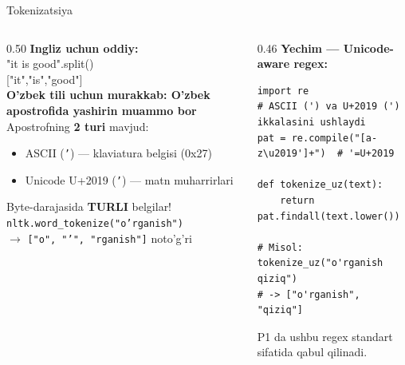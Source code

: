 \documentclass[aspectratio=169,11pt]{beamer}
\begin{document}
\begin{frame}[fragile]{Tokenizatsiya}
  \begin{columns}[T]
    \begin{column}{0.50\textwidth}
      \textbf{Ingliz uchun oddiy:}\\[3pt]
      \footnotesize\ttfamily
      "it is good".split()\\
      \textrightarrow{} ["it","is","good"]\\[7pt]
      \normalfont\small\textbf{O'zbek tili uchun murakkab: O'zbek apostrofida yashirin muammo bor}\\[3pt]
      \footnotesize
      Apostrofning \textbf{2 turi} mavjud:
      \begin{itemize}\setlength\itemsep{2pt}
        \item ASCII (\texttt{'}) --- klaviatura belgisi (0x27)
        \item Unicode U+2019 (\texttt{'}) --- matn muharrirlari
      \end{itemize}
      \vspace{3pt}
      Byte-darajasida \textbf{TURLI} belgilar!\\[3pt]
      \texttt{nltk.word\_tokenize("o'rganish")}\\
      $\to$ \texttt{["o", "'", "rganish"]}
      \quad\alert{noto'g'ri}
    \end{column}
    \begin{column}{0.46\textwidth}
      \textbf{Yechim --- Unicode-aware regex:}\\[4pt]
      \begin{lstlisting}[numbers=none,frame=single,
                         basicstyle=\ttfamily\tiny]
import re
# ASCII (') va U+2019 (') ikkalasini ushlaydi
pat = re.compile("[a-z\u2019']+")  # '=U+2019

def tokenize_uz(text):
    return pat.findall(text.lower())

# Misol:
tokenize_uz("o'rganish qiziq")
# -> ["o'rganish", "qiziq"]
      \end{lstlisting}
      \begin{tcolorbox}[warnbox,title=P1 eslatma,top=2pt,bottom=2pt]
        \footnotesize
        P1 da ushbu regex
        standart sifatida
        qabul qilinadi.
      \end{tcolorbox}
    \end{column}
  \end{columns}
\end{frame}
\end{document}

